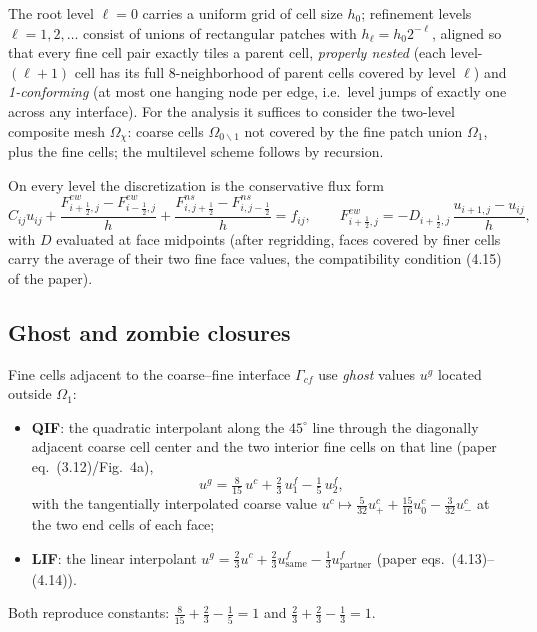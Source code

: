 \documentclass[11pt]{article}
\theoremstyle{remark}
\begin{document}
The root level $\ell=0$ carries a uniform grid of cell size
$h_0$; refinement levels $\ell=1,2,\dots$ consist of unions of
rectangular patches with $h_\ell=h_0 2^{-\ell}$, aligned so that every
fine cell pair exactly tiles a parent cell, \emph{properly nested} (each
level-$(\ell+1)$ cell has its full 8-neighborhood of parent cells
covered by level $\ell$) and \emph{1-conforming} (at most one hanging
node per edge, i.e.\ level jumps of exactly one across any interface).
For the analysis it suffices to consider the two-level composite mesh
$\Omega_\chi$: coarse cells $\Omega_{0\backslash 1}$ not covered by the
fine patch union $\Omega_1$, plus the fine cells; the multilevel scheme
follows by recursion.

On every level the discretization is the conservative flux form
\begin{equation}\label{eq:fluxform}
  C_{ij}u_{ij}
  + \frac{F^{ew}_{i+\frac12,j}-F^{ew}_{i-\frac12,j}}{h}
  + \frac{F^{ns}_{i,j+\frac12}-F^{ns}_{i,j-\frac12}}{h} = f_{ij},
  \qquad
  F^{ew}_{i+\frac12,j} = -D_{i+\frac12,j}\,
  \frac{u_{i+1,j}-u_{ij}}{h},
\end{equation}
with $D$ evaluated at face midpoints (after regridding, faces covered by
finer cells carry the average of their two fine face values, the
compatibility condition (4.15) of the paper).

\subsection{Ghost and zombie closures}
Fine cells adjacent to the coarse--fine interface $\Gamma_{cf}$ use
\emph{ghost} values $u^{g}$ located outside $\Omega_1$:
\begin{itemize}
\item \textbf{QIF}: the quadratic interpolant along the $45^\circ$ line
through the diagonally adjacent coarse cell center and the two interior
fine cells on that line (paper eq.~(3.12)/Fig.~4a),
\begin{equation}\label{eq:qif}
  u^{g} = \tfrac{8}{15}\,u^{c} + \tfrac{2}{3}\,u^{f}_{1}
        - \tfrac{1}{5}\,u^{f}_{2},
\end{equation}
with the tangentially interpolated coarse value
$u^{c}\mapsto \tfrac{5}{32}u^c_{+}+\tfrac{15}{16}u^c_{0}-\tfrac{3}{32}u^c_{-}$
at the two end cells of each face;
\item \textbf{LIF}: the linear interpolant
$u^{g} = \tfrac23 u^{c} + \tfrac23 u^{f}_{\mathrm{same}}
 - \tfrac13 u^{f}_{\mathrm{partner}}$ (paper eqs.~(4.13)--(4.14)).
\end{itemize}
Both reproduce constants: $\tfrac8{15}+\tfrac23-\tfrac15=1$ and
$\tfrac23+\tfrac23-\tfrac13=1$.
\end{document}
